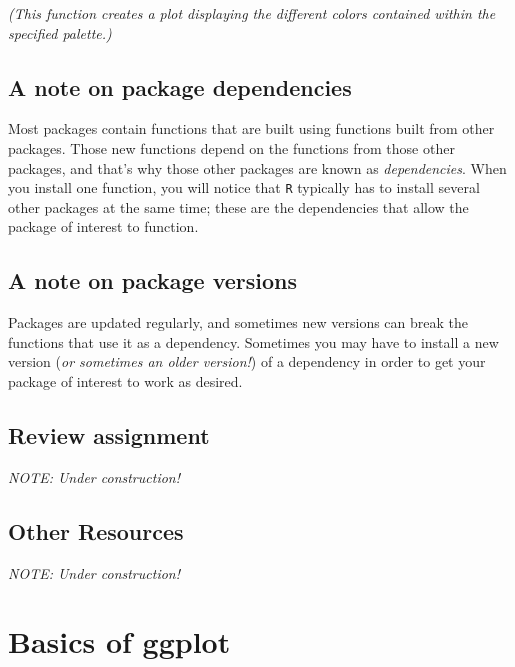 \documentclass[
]{book}
\begin{document}
\emph{(This function creates a plot displaying the different colors contained within the specified palette.)}

\hypertarget{a-note-on-package-dependencies}{%
\section*{A note on package dependencies}\label{a-note-on-package-dependencies}}

Most packages contain functions that are built using functions built from other packages. Those new functions depend on the functions from those other packages, and that's why those other packages are known as \emph{dependencies}. When you install one function, you will notice that \texttt{R} typically has to install several other packages at the same time; these are the dependencies that allow the package of interest to function.

\hypertarget{a-note-on-package-versions}{%
\section*{A note on package versions}\label{a-note-on-package-versions}}

Packages are updated regularly, and sometimes new versions can break the functions that use it as a dependency. Sometimes you may have to install a new version (\emph{or sometimes an older version!}) of a dependency in order to get your package of interest to work as desired.

\hypertarget{review-assignment-6}{%
\section*{Review assignment}\label{review-assignment-6}}

\emph{NOTE: Under construction!}

\hypertarget{other-resources-4}{%
\section*{Other Resources}\label{other-resources-4}}

\emph{NOTE: Under construction!}

\hypertarget{basics-of-ggplot}{%
\chapter{Basics of ggplot}\label{basics-of-ggplot}}
\end{document}
